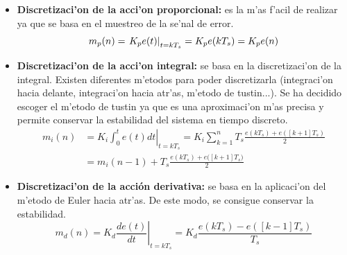 \begin{itemize}
         \item\textbf{Discretizaci'on de la acci'on proporcional:} es la m'as f'acil de realizar ya que se basa en el muestreo de la se'nal de error.
	\begin{equation}\label{ecuacion_prop}
		\large m_{p}(n) =\left. K_{p} e(t) \right|_{t=kT_{s}} =  K_{p} e(kT_{s}) =   K_{p} e(n)
           \end{equation}
	\item\textbf{Discretizaci'on de la acci'on integral:} se basa en la discretizaci'on de la integral. Existen diferentes m'etodos para poder discretizarla (integraci'on hacia delante, integraci'on hacia atr'as, m'etodo de tustin...)\cite{PID}. Se ha decidido escoger el m'etodo de tustin ya que es una aproximaci'on m'as precisa y permite conservar la estabilidad del sistema en tiempo discreto.
	\begin{equation}\label{ecuacion_int}
	   \begin{split}
		 m_{i}(n) & = \left.  K_{i}\int_0^t e(t)dt \right|_{t=kT_{s}} =  K_{i}\sum_{k=1}^n  T_{s}\frac{e(kT_{s}) + e([k+1]T_{s})}{2} \\
                                     & = m_{i}(n-1) +  T_{s}\frac{e(kT_{s}) + e( [k+1]T_{s}\big)}{2} 
 	   \end{split}	
	\end{equation}
	 \item \textbf{Discretizaci'on de la acción derivativa:} se basa en la aplicaci'on del m'etodo de Euler hacia atr'as. De este modo, se consigue conservar la estabilidad.
            \begin{equation}\label{ecuacion_der}
		m_{d}(n)  =\left.  K_{d} \frac{de(t)}{dt} \right|_{t=kT_{s}}= K_{d} \frac{e(kT_{s}) - e([k-1]T_{s})}{T_{s}}
	\end{equation}
\end{itemize}

